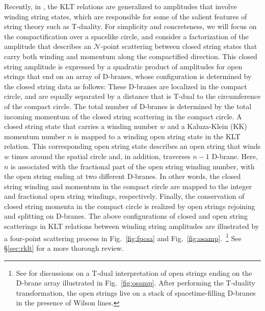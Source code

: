 \documentclass[11pt]{article}
\newcommand{\CN}{\mathcal{N}}
\begin{document}
Recently, in \cite{Gomis:2021ire}, the KLT relations are generalized to amplitudes that involve winding string states,
which are responsible for some of the salient features of string theory such as T-duality. For simplicity and concreteness, we will focus on the compactification over a spacelike circle, and consider a factorization of the amplitude that describes an $\CN$-point scattering between closed string states that carry both winding and momentum along the compactified direction. This closed string amplitude is expressed by a quadratic product of amplitudes for open strings that end on an array of D-branes, whose configuration is determined by the closed string data as follows: These D-branes are localized in the compact circle, and are equally separated by a distance that is T-dual to the circumference of the compact circle. The total number of D-branes is determined by the total incoming momentum of the closed string scattering in the compact circle. A closed string state that carries a winding number $w$ and a Kaluza-Klein (KK) momentum number $n$ is mapped to a winding open string state in the KLT relation. This corresponding open string state describes an open string that winds $w$ times around the spatial circle and, in addition, traverses $n-1$ D-brane. Here, $n$ is associated with the fractional part of the open string winding number, with the open string ending at two different D-branes. In other words, the closed string winding and momentum in the compact circle are mapped to the integer and fractional open string windings, respectively. Finally, the conservation of closed string momenta in the compact circle is realized by open strings rejoining and splitting on D-branes. The above configurations of closed and open string scatterings in KLT relations between winding string amplitudes are illustrated by a four-point scattering process in Fig.~\ref{fig:fpcsa} and Fig.~\ref{fig:osamp}.~\footnote{See \cite{Gomis:2021ire} for discussions on a T-dual interpretation of open strings ending on the D-brane array illustrated in Fig.~\ref{fig:osamp}. After performing the T-duality transformation, the open strings live on a stack of spacetime-filling D-branes in the presence of Wilson lines.} See \S\ref{sec:rklt} for a more thorough review.
%
\end{document}
